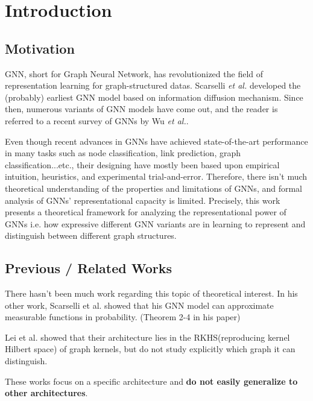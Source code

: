 \chapter{Introduction}

\section{Motivation}
GNN, short for Graph Neural Network, has revolutionized the field of representation learning for graph-structured datas. Scarselli {\it et al.}\cite{Scarselli2009a} developed the (probably) earliest GNN model based on information diffusion mechanism.
Since then, numerous variants of GNN models have come out, and the reader is referred to a recent survey of GNNs by Wu {\it et al.}\cite{Wu2019}.

Even though recent advances in GNNs have achieved state-of-the-art performance in many tasks such as node classification, link prediction, graph classification...etc., their designing have mostly been based upon empirical intuition, heuristics, and experimental trial-and-error.
Therefore, there isn't much theoretical understanding of the properties and limitations of GNNs, and formal analysis of GNNs' representational capacity is limited.\cite{Xu2019}
Precisely, this work presents a theoretical framework for analyzing the representational power of GNNs i.e. how expressive different GNN variants are in learning to represent and distinguish between different graph structures.


\section{Previous / Related Works}

There hasn't been much work regarding this topic of theoretical interest.
In his other work, Scarselli et al.\cite{Scarselli2009b} showed that his GNN model\cite{Scarselli2009a} can approximate measurable functions in probability. (Theorem 2-4 in his paper)

Lei et al.\cite{Lei2017} showed that their architecture lies in the RKHS(reproducing kernel Hilbert space) of graph kernels, but do not study explicitly which graph it can distinguish.


These works focus on a specific architecture and {\bf do not easily generalize to other architectures}.